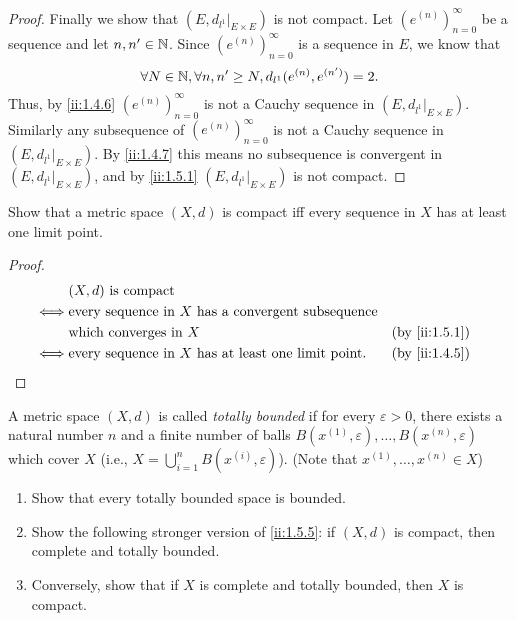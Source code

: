 \begin{proof}
  Finally we show that \((E, d_{l^1}|_{E \times E})\) is not compact.
  Let \((e^{(n)})_{n = 0}^\infty\) be a sequence and let \(n, n' \in \mathbb{N}\).
  Since \((e^{(n)})_{n = 0}^\infty\) is a sequence in \(E\), we know that
  \[
    \forall N \in \mathbb{N}, \forall n, n' \geq N, d_{l^1}(e^{(n)}, e^{(n')}) = 2.
  \]
  Thus, by \cref{ii:1.4.6} \((e^{(n)})_{n = 0}^\infty\) is not a Cauchy sequence in \((E, d_{l^1}|_{E \times E})\).
  Similarly any subsequence of \((e^{(n)})_{n = 0}^\infty\) is not a Cauchy sequence in \((E, d_{l^1}|_{E \times E})\).
  By \cref{ii:1.4.7} this means no subsequence is convergent in \((E, d_{l^1}|_{E \times E})\), and by \cref{ii:1.5.1} \((E, d_{l^1}|_{E \times E})\) is not compact.
\end{proof}

\begin{ex}\label{ii:ex:1.5.9}
  Show that a metric space \((X, d)\) is compact iff every sequence in \(X\) has at least one limit point.
\end{ex}

\begin{proof}
  \begin{align*}
         & (X, d) \text{ is compact}                                                            \\
    \iff & \text{every sequence in } X \text{ has a convergent subsequence}                     \\
         & \text{which converges in } X                                      &  & \by{ii:1.5.1} \\
    \iff & \text{every sequence in } X \text{ has at least one limit point}. &  & \by{ii:1.4.5}
  \end{align*}
\end{proof}

\begin{ex}\label{ii:ex:1.5.10}
  A metric space \((X, d)\) is called \emph{totally bounded} if for every \(\varepsilon > 0\), there exists a natural number \(n\) and a finite number of balls \(B(x^{(1)}, \varepsilon), \dots, B(x^{(n)}, \varepsilon)\) which cover \(X\) (i.e., \(X = \bigcup_{i = 1}^n B(x^{(i)}, \varepsilon)\)).
  (Note that \(x^{(1)}, \dots, x^{(n)} \in X\))
  \begin{enumerate}
    \item Show that every totally bounded space is bounded.
    \item Show the following stronger version of \cref{ii:1.5.5}:
          if \((X, d)\) is compact, then complete and totally bounded.
    \item Conversely, show that if \(X\) is complete and totally bounded, then \(X\) is compact.
  \end{enumerate}
\end{ex}

